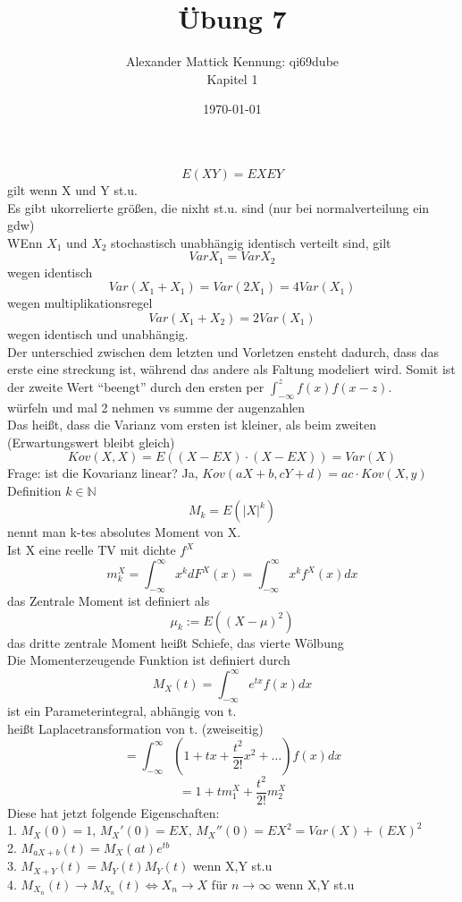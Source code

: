 \documentclass{article}
\author{
Alexander Mattick Kennung: qi69dube\\
Kapitel 1
}
\date{\today}
\title{Übung 7}
\begin{document}
	\maketitle
	\[E(XY)=EXEY\]
	gilt wenn X und Y st.u.\\
	Es gibt ukorrelierte größen, die nixht st.u. sind (nur bei normalverteilung ein gdw)\\
	WEnn $X_1$ und $X_2$ stochastisch unabhängig identisch verteilt sind, gilt
	\[VarX_1 = VarX_2\]
	wegen identisch
	\[Var(X_1+X_1)=Var(2X_1)=4Var(X_1)\]
	wegen multiplikationsregel
	\[Var(X_1+X_2)=2Var(X_1)\]
	wegen identisch und unabhängig.\\
	Der unterschied zwischen dem letzten und Vorletzen ensteht dadurch, dass das erste eine streckung ist, während das andere als Faltung modeliert wird. Somit ist der zweite Wert ``beengt'' durch den ersten per $\int^z_{-\infty}f(x)f(x-z) $.\\
	würfeln und mal 2 nehmen vs summe der augenzahlen\\
	Das heißt, dass die Varianz vom ersten ist kleiner, als beim zweiten (Erwartungswert bleibt gleich)\\
	\[Kov(X,X) = E((X-EX)\cdot (X-EX)) = Var(X)\]
	Frage: ist die Kovarianz linear? Ja, $Kov(aX+b,cY+d) = ac\cdot Kov(X,y)$\\
	Definition $k\in\mathbb{N}$
	\[M_k = E(|X|^k)\]
	nennt man k-tes absolutes Moment von X.\\
	Ist X eine reelle TV mit dichte $f^X$\\
	\[m_k^X = \int_{-\infty}^\infty x^kd F^X(x)=\int_{-\infty}^\infty x^k f^X(x)dx\]
	das Zentrale Moment ist definiert als
	\[\mu_k:=E((X-\mu)^2)\]
	das dritte zentrale Moment heißt Schiefe, das vierte Wölbung\\
	Die Momenterzeugende Funktion ist definiert durch
	\[M_X(t)=\int^\infty_{-\infty}e^{tx}f(x)dx\]
	ist ein Parameterintegral, abhängig von t.\\
	heißt Laplacetransformation von t. (zweiseitig)\\
	\[=\int^\infty_{-\infty} (1+tx+\frac{t^2}{2!}x^2+\dots)f(x)dx\]
	\[=1+tm_1^X+\frac{t^2}{2!}m_2^X\]
	Diese hat jetzt folgende Eigenschaften:\\
	1. $M_X(0)=1$, $M_X'(0)=EX$, $M_X''(0)=EX^2 =Var(X)+(EX)^2$\\
	2. $M_{aX+b}(t)=M_X(at)e^{tb}$\\
	3. $M_{X+Y}(t)=M_Y(t)M_Y(t)$ wenn X,Y st.u\\
	4. $M_{X_n}(t)\to M_{X_n}(t)\iff X_n\to X$ für $n\to\infty$ wenn X,Y st.u\\
\end{document}

